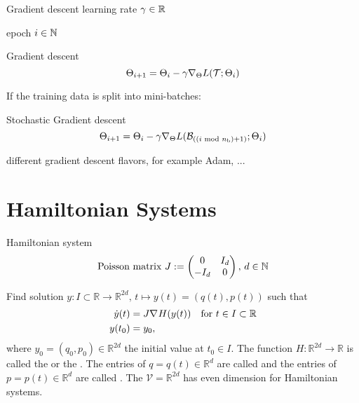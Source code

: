 \begin{frame}{Gradient descent}
  learning rate $\gamma \in  \R$

  epoch $i \in \N$
  \begin{block}{Gradient descent}
    \begin{equation*}
      \Theta_{i+1} = \Theta_i - \gamma \grad[\Theta]{L(\mathcal{T};\Theta_{i})}
    \end{equation*}
  \end{block}

  If the training data is split into mini-batches:
  \begin{block}{Stochastic Gradient descent}
    \begin{equation*}
      \Theta_{i+1} = \Theta_i - \gamma \grad[\Theta]{L(
        \mathcal{B}_{((i \textrm{ mod } n_{\text{b}}) + 1)};
        \Theta_{i})}
    \end{equation*}
  \end{block}

  different gradient descent flavors, for example Adam, ...
\end{frame}

\section{Hamiltonian Systems}

\begin{frame}{Hamiltonian system}
  \begin{equation*}
    \text{Poisson matrix } J := \begin{pmatrix}
      0 & I_d \\
      -I_d & 0
    \end{pmatrix}, \,
    d \in \N
  \end{equation*}

  \begin{definition}
    Find solution $y: I \subset \mathbb{R} \to \mathbb{R}^{2d},\, t \mapsto y(t) = (q(t),p(t))$
    such that
    \begin{align*}
      \dot{y}(t) &= J \grad{H}(y(t)) \quad \text{for } t \in I \subset \mathbb{R} \\
      y(t_0) &= y_0
      ,
    \end{align*}
    where $y_0 = (q_0, p_0) \in \mathbb{R}^{2d}$ the initial value at $t_0 \in I$.
    The function $H: \mathbb{R}^{2d} \to \mathbb{R}$ is called the 
    or the . The entries of $q = q(t) \in \mathbb{R}^d$ are called 
    and the entries of $p=p(t) \in \mathbb{R}^d$ are called . 
    The  $\mathcal{V} = \mathbb{R}^{2d}$ has even dimension for Hamiltonian systems.
  \end{definition}
\end{frame}

